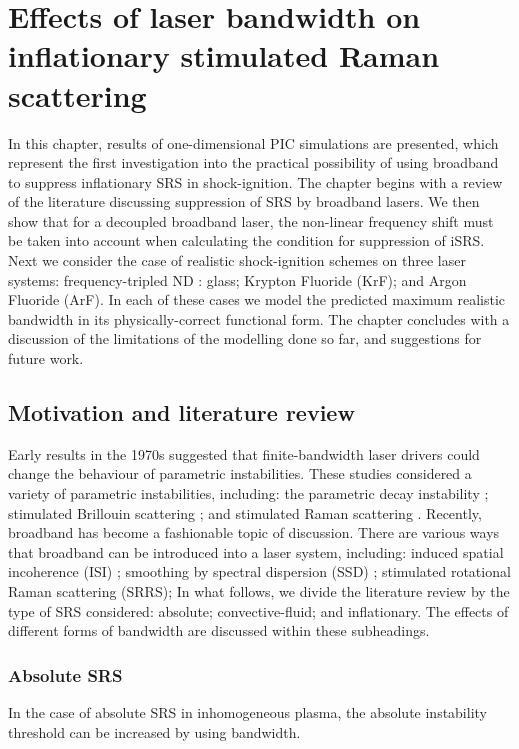 \chapter{Effects of laser bandwidth on inflationary stimulated Raman scattering}
\label{chp:broadbandSRS}

In this chapter, results of one-dimensional PIC simulations are presented, which represent the first investigation into the practical possibility of using broadband to suppress inflationary SRS in shock-ignition. The chapter begins with a review of the literature discussing suppression of SRS by broadband lasers. We then show that for a decoupled broadband laser, the non-linear frequency shift must be taken into account when calculating the condition for suppression of iSRS. Next we consider the case of realistic shock-ignition schemes on three laser systems: frequency-tripled ND : glass; Krypton Fluoride (KrF); and Argon Fluoride (ArF). In each of these cases we model the predicted maximum realistic bandwidth in its physically-correct functional form. The chapter concludes with a discussion of the limitations of the modelling done so far, and suggestions for future work.

\section{Motivation and literature review}

Early results in the 1970s suggested that finite-bandwidth laser drivers could change the behaviour of parametric instabilities. These studies considered a variety of parametric instabilities, including: the parametric decay instability \citep{Thomson1974}; stimulated Brillouin scattering \citep{Kruer1973}; and stimulated Raman scattering \citep{raymer_theory_1979}. Recently, broadband has become a fashionable topic of discussion. There are various ways that broadband can be introduced into a laser system, including: induced spatial incoherence (\acrshort{ISI}) \citep{Lehmberg198327}; smoothing by spectral dispersion (\acrshort{SSD}) \citep{Skupsky1989}; stimulated rotational Raman scattering (SRRS);  In what follows, we divide the literature review by the type of SRS considered: absolute; convective-fluid; and inflationary. The effects of different forms of bandwidth are discussed within these subheadings.

\subsection{Absolute SRS}
In the case of absolute SRS in inhomogeneous plasma, the absolute instability threshold can be increased by using bandwidth.

